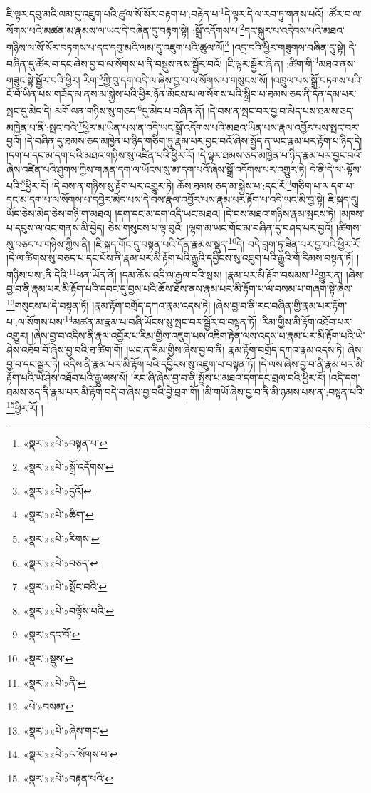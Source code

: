 ཇི་ལྟར་དབུ་མའི་ལམ་དུ་འཇུག་པའི་ཚུལ་སོ་སོར་བརྟག་པ་:བརྟེན་པ་\footnote{«སྣར་»«པེ་»བསྟན་པ་}དེ་ལྟར་དེ་ལ་རབ་ཏུ་གནས་པའོ། །ཚོར་བ་ལ་སོགས་པའི་མཚན་མ་རྣམས་ལ་ཡང་དེ་བཞིན་དུ་བརྟག་སྟེ། :སྒྲོ་འདོགས་པ་\footnote{«སྣར་»«པེ་»སྒྲོ་འདོགས་}དང་སྐུར་པ་འདེབས་པའི་མཐའ་གཉིས་ལ་སོ་སོར་བཏགས་པ་དང་དབུ་མའི་ལམ་དུ་འཇུག་པའི་ཚུལ་ལོ།\footnote{«སྣར་»«པེ་»དུའོ།} །འདྲ་བའི་ཕྱིར་གཟུགས་བཞིན་དུ་སྟེ། དེ་བཞིན་དུ་ཚོར་བ་དང་ཞེས་བྱ་བ་ལ་སོགས་པ་ནི་བསྡུས་ནས་སྦྱོར་བའོ། །ཇི་ལྟར་སྦྱོར་ཞེ་ན། :ཚིག་གི་\footnote{«སྣར་»«པེ་»ཚིག་}མཐའ་ནས་གཟུང་སྟེ་སྦྱོར་བའི་ཕྱིར། རིག་\footnote{«སྣར་»«པེ་»རིགས་}ཀྱི་བུ་དག་འདི་ལ་ཞེས་བྱ་བ་ལ་སོགས་པ་གསུངས་སོ། །འཁྲུལ་པས་སྒྲོ་བཏགས་པའི་ངོ་བོ་ཡིན་པས་གཟོད་མ་ནས་མ་སྐྱེས་པའི་ཕྱིར་ཉོན་མོངས་པ་ལ་སོགས་པའི་སྒྲིབ་པ་ཐམས་ཅད་ནི་དོན་དམ་པར་སྤང་དུ་མེད་དེ། མགོ་ལན་གཉིས་སུ་གཅད་\footnote{«སྣར་»«པེ་»བཅད་}དུ་མེད་པ་བཞིན་ནོ། །དེ་བས་ན་སྤང་བར་བྱ་བ་མེད་པས་ཐམས་ཅད་མཁྱེན་པ་ནི་:སྤང་བའི་\footnote{«སྣར་»«པེ་»སྤོང་བའི་}ཕྱིར་མ་ཡིན་པས་ན་འདི་ཡང་སྒྲོ་འདོགས་པའི་མཐའ་ཡིན་པས་རྣལ་འབྱོར་པས་སྤང་བར་བྱའོ། །དེ་བཞིན་དུ་ཐམས་ཅད་མཁྱེན་པ་ཉིད་གཅིག་ཏུ་རྣམ་པར་བྱང་བའོ་ཞེས་སྤྱོད་ན་ཡང་རྣམ་པར་རྟོག་པ་ཉིད་དེ། །དག་པ་དང་མ་དག་པའི་མཐའ་གཉིས་སུ་འཛིན་པའི་ཕྱིར་རོ། །དེ་ལྟར་ཐམས་ཅད་མཁྱེན་པ་ཉིད་རྣམ་པར་བྱང་བའོ་ཞེས་འཛིན་པའི་ཤུགས་ཀྱིས་གཞན་དག་ལ་ཡོངས་སུ་མ་དག་པའོ་ཞེས་སྒྲོ་འདོགས་པར་འགྱུར་ཏེ། དེ་ནི་དེ་ལ་:ལྟོས་པའི་\footnote{«སྣར་»«པེ་»བལྟོས་པའི་}ཕྱིར་རོ། །དེ་བས་ན་གཉིས་སུ་རྟོག་པར་འགྱུར་ཏེ། ཆོས་ཐམས་ཅད་མ་སྐྱེས་པ་:དང་རོ་\footnote{«སྣར་»དང་བོ་}གཅིག་པ་ལ་དག་པ་དང་མ་དག་པ་ལ་སོགས་པ་དབྱེར་མེད་པས་དེ་བས་རྣལ་འབྱོར་པས་རྣམ་པར་རྟོག་པ་འདི་ཡང་མི་བྱ་སྟེ། ཇི་སྐད་དུ། ཡོད་ཅེས་མེད་ཅེས་གཉི་ག་མཐའ། །དག་དང་མ་དག་འདི་ཡང་མཐའ། །དེ་བས་མཐའ་གཉིས་རྣམ་སྤངས་ཏེ། །མཁས་པ་དབུས་ལ་འང་གནས་མི་བྱེད། ཅེས་གསུངས་པ་ལྟ་བུའོ། །ལྷག་མ་ཡང་གོང་མ་བཞིན་དུ་བཤད་པར་བྱའོ། །ཚིགས་སུ་བཅད་པ་གཉིས་ཀྱིས་ནི། །ཇི་སྐད་གོང་དུ་བསྟན་པའི་དོན་རྣམས་སྡུད་\footnote{«སྣར་»སྡུས་}དེ། བདེ་བླག་ཏུ་ཟིན་པར་བྱ་བའི་ཕྱིར་རོ། །དེ་ལ་ཚིགས་སུ་བཅད་པ་དང་པོས་ནི་རྣམ་པར་མི་རྟོག་པའི་རྒྱུའི་དབྱིངས་སུ་འཇུག་པའི་རྒྱུའི་གོ་རིམས་བསྟན་ཏོ། །གཉིས་པས་:ནི་དེའི་\footnote{«སྣར་»«པེ་»ནི་}ཕན་ཡོན་ནོ། །དམ་ཆོས་འདི་ལ་རྒྱལ་བའི་སྲས། །རྣམ་པར་མི་རྟོག་བསམས་\footnote{«པེ་»བསམ་}གྱུར་ན། །ཞེས་བྱ་བ་ནི་རྣམ་པར་མི་རྟོག་པའི་དབང་དུ་བྱས་པའི་ཆོས་ཐོས་ནས་རྣམ་པར་མི་རྟོག་པ་ལ་བསམ་པ་གཞག་སྟེ་ཞེས་\footnote{«སྣར་»«པེ་»ཞེས་གང་}གསུངས་པ་དེ་བསྟན་ཏོ། །རྣམ་རྟོག་བགྲོད་དཀའ་རྣམ་འདས་ཏེ། །ཞེས་བྱ་བ་ནི་རང་བཞིན་གྱི་རྣམ་པར་རྟོག་པ་:ལ་སོགས་པས་\footnote{«སྣར་»«པེ་»ལ་སོགས་པ་}མཚན་མ་རྣམ་པ་བཞི་ཡོངས་སུ་སྤང་བར་སྦྱོར་བ་བསྟན་ཏོ། །རིམ་གྱིས་མི་རྟོག་འཐོབ་པར་འགྱུར། །ཞེས་བྱ་བ་འདིས་ནི་རྣལ་འབྱོར་པ་རིམ་གྱིས་འཇུག་པས་འཇིག་རྟེན་ལས་འདས་པ་རྣམ་པར་མི་རྟོག་པའི་ཡེ་ཤེས་འཐོབ་བོ་ཞེས་བྱ་བའི་ཐ་ཚིག་གོ། །ཡང་ན་རིམ་གྱིས་ཞེས་བྱ་བ་ནི། རྣམ་རྟོག་བགྲོད་དཀའ་རྣམ་འདས་ཏེ། ཞེས་བྱ་བ་དང་སྦྱར་ཏེ། འདིས་ནི་རྣམ་པར་མི་རྟོག་པའི་དབྱིངས་སུ་འཇུག་པ་བསྟན་ཏོ། །དེ་ལས་ཞེས་བྱ་བ་ནི་རྣམ་པར་མི་རྟོག་པའི་ཡེ་ཤེས་འཐོབ་པའི་རྒྱུ་ལས་སོ། །རབ་ཞི་ཞེས་བྱ་བ་ནི་སྤྲོས་པ་མཐའ་དག་དང་བྲལ་བའི་ཕྱིར་རོ། །འདི་དག་ཐམས་ཅད་ནི་རྣམ་པར་མི་རྟོག་བདེ་བ་ཞེས་བྱ་བའི་བྱེ་བྲག་གོ། །མི་གཡོ་ཞེས་བྱ་བ་ནི་མི་ཉམས་པས་ན་:བསྟན་པའི་\footnote{«སྣར་»«པེ་»བརྟན་པའི་}ཕྱིར་རོ། །

